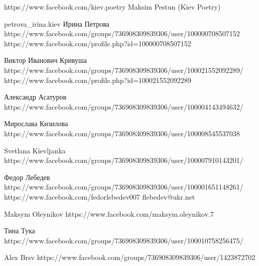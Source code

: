  
 
 
 
 

https://www.facebook.com/kiev.poetry
Maksim Pestun (Kiev Poetry)

petrova_irina.kiev
Ирина Петрова
https://www.facebook.com/groups/736908309839306/user/100000708507152
https://www.facebook.com/profile.php?id=100000708507152

Виктор Иванович Кривуша
https://www.facebook.com/groups/736908309839306/user/100021552092289/
https://www.facebook.com/profile.php?id=100021552092289

Александр Асатуров
https://www.facebook.com/groups/736908309839306/user/100004143494632/

Мирослава Кизилова
https://www.facebook.com/groups/736908309839306/user/100008545537038

Svetlana Kievljanka
https://www.facebook.com/groups/736908309839306/user/100007910143201/

Федор Лебедев
https://www.facebook.com/groups/736908309839306/user/100001651148261/
https://www.facebook.com/fedorlebedev007
flebedev@ukr.net

Maksym Oleynikov
https://www.facebook.com/maksym.oleynikov.7

Тина Тука
https://www.facebook.com/groups/736908309839306/user/100010758256475/

Alex Brsv
https://www.facebook.com/groups/736908309839306/user/1423872702
